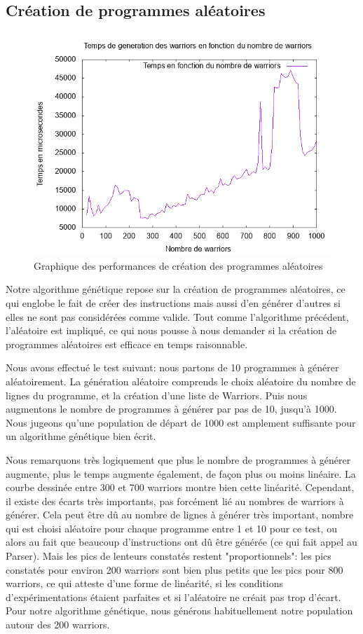 \documentclass[hidelinks]{report}
\begin{document}
\subsection{Création de programmes aléatoires}
\begin{figure}
    \centering
    \includegraphics[scale=0.8]{images/graphiques/randomWPerf.png}
    \caption{Graphique des performances de création des programmes aléatoires}
    \label{fig:perfRandomW}
\end{figure}
Notre algorithme génétique repose sur la création de programmes aléatoires, ce qui englobe le fait de créer des instructions mais aussi d'en générer d'autres si elles ne sont pas considérées comme valide. Tout comme l'algorithme précédent, l'aléatoire est impliqué, ce qui nous pousse à nous demander si la création de programmes aléatoires est efficace en temps raisonnable. 

Nous avons effectué le test suivant: nous partons de 10 programmes à générer aléatoirement. La génération aléatoire comprends le choix aléatoire du nombre de lignes du programme, et la création d'une liste de Warriors. Puis nous augmentons le nombre de programmes à générer par pas de 10, jusqu'à 1000. Nous jugeons qu'une population de départ de 1000 est amplement suffisante pour un algorithme génétique bien écrit.

Nous remarquons très logiquement que plus le nombre de programmes à générer augmente, plus le temps augmente également, de façon plus ou moins linéaire. La courbe dessinée entre 300 et 700 warriors montre bien cette linéarité. Cependant, il existe des écarts très importants, pas forcément lié au nombres de warriors à générer. Cela peut être dû au nombre de lignes à générer très important, nombre qui est choisi aléatoire pour chaque programme entre 1 et 10 pour ce test, ou alors au fait que beaucoup d'instructions ont dû être générée (ce qui fait appel au Parser). Mais les pics de lenteurs constatés restent "proportionnels": les pics constatés pour environ 200 warriors sont bien plus petits que les pics pour 800 warriors, ce qui atteste d'une forme de linéarité, si les conditions d'expérimentations étaient parfaites et si l'aléatoire ne créait pas trop d'écart. Pour notre algorithme génétique, nous générons habituellement notre population autour des 200 warriors. 
\end{document}
